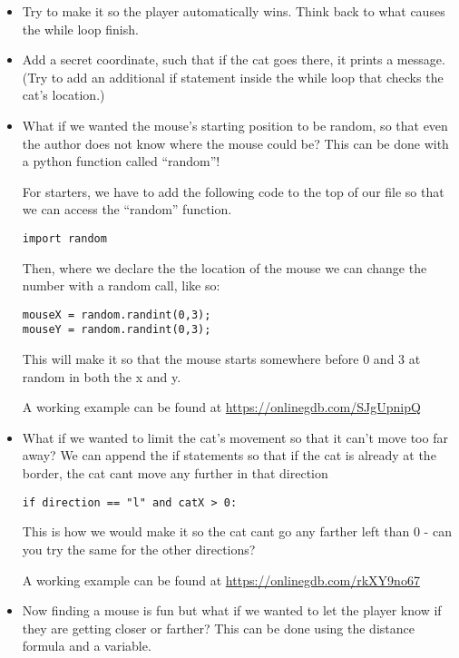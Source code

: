 \documentclass[12pt,oneside]{article}
\newcommand{\q}[1]{``#1''}
\begin{document}
\begin{itemize}

\item Try to make it so the player automatically wins. Think back to what causes the while loop finish.
\item Add a secret coordinate, such that if the cat goes there, it prints a message. (Try to add an additional if statement inside the while loop that checks the cat's location.)
\item What if we wanted the mouse's starting position to be random, so that even the author does not know where the mouse could be? This can be done with a python function called \q{random}!

For starters, we have to add the following code to the top of our file so that we can access the \q{random} function.

\begin{lstlisting}
import random
\end{lstlisting}

Then, where we declare the the location of the mouse we can change the number with a random call, like so:


\begin{lstlisting}
mouseX = random.randint(0,3);
mouseY = random.randint(0,3);
\end{lstlisting}

This will make it so that the mouse starts somewhere before 0 and 3 at random in both the x and y. 

A working example can be found at \url{https://onlinegdb.com/SJgUpnipQ}

\item What if we wanted to limit the cat's movement so that it can't move too far away? We can append the if statements so that if the cat is already at the border, the cat cant move any further in that direction

\begin{lstlisting}
if direction == "l" and catX > 0:
\end{lstlisting}

This is how we would make it so the cat cant go any farther left than 0 - can you try the same for the other directions?

A working example can be found at \url{https://onlinegdb.com/rkXY9no67}

\item Now finding a mouse is fun but what if we wanted to let the player know if they are getting closer or farther? This can be done using the distance formula and a variable. 


\end{itemize}
\end{document}
